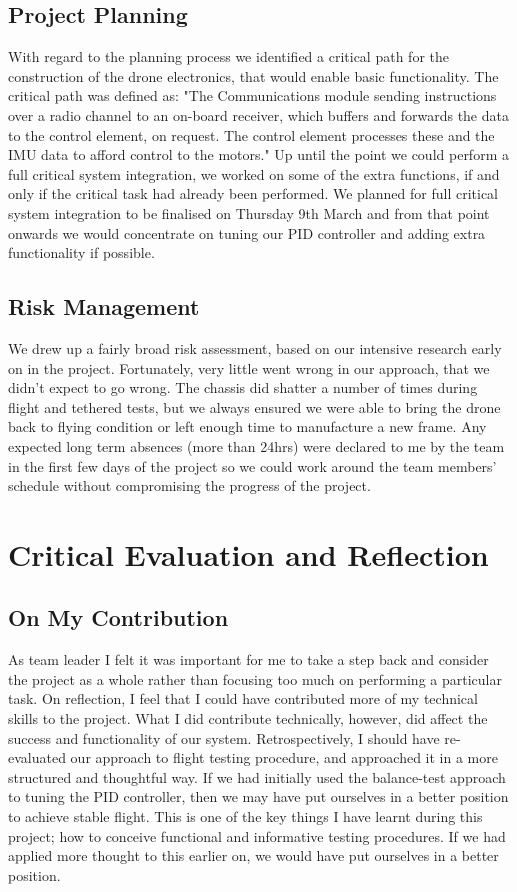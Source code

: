\documentclass[a4paper,11pt]{article}
\begin{document}
\subsection{Project Planning}
With regard to the planning process we identified a critical path for the construction of the drone electronics, that would enable basic functionality. The critical path was defined as: "The Communications module sending instructions over a radio channel to an on-board receiver, which buffers and forwards the data to the control element, on request. The control element processes these and the IMU data to afford control to the motors." Up until the point we could perform a full critical system integration, we worked on some of the extra functions, if and only if the critical task had already been performed. We planned for full critical system integration to be finalised on Thursday 9th March and from that point onwards we would concentrate on tuning our PID controller and adding extra functionality if possible.
\subsection{Risk Management}
We drew up a fairly broad risk assessment, based on our intensive research early on in the project. Fortunately, very little went wrong in our approach, that we didn't expect to go wrong. The chassis did shatter a number of times during flight and tethered tests, but we always ensured we were able to bring the drone back to flying condition or left enough time to manufacture a new frame. Any expected long term absences (more than 24hrs) were declared to me by the team in the first few days of the project so we could work around the team members' schedule without compromising the progress of the project.


\section{Critical Evaluation and Reflection}
\subsection{On My Contribution}
 As team leader I felt it was important for me to take a step back and consider the project as a whole rather than focusing too much on performing a particular task. On reflection, I feel that I could have contributed more of my technical skills to the project. What I did contribute technically, however, did affect the success and functionality of our system. Retrospectively, I should have re-evaluated our approach to flight testing procedure, and approached it in a more structured and thoughtful way.
 If we had initially used the balance-test approach to tuning the PID controller, then we may have put ourselves in a better position to achieve stable flight. This is one of the key things I have learnt during this project; how to conceive functional and informative testing procedures. If we had applied more thought to this earlier on, we would have put ourselves in a better position.
\end{document}
